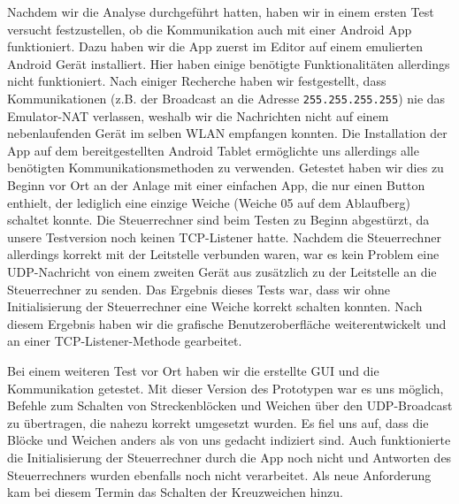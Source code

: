 \documentclass{article}
\begin{document}
Nachdem wir die Analyse durchgeführt hatten, haben wir in einem ersten Test versucht festzustellen, ob die Kommunikation auch mit einer Android App funktioniert.
Dazu haben wir die App zuerst im Editor auf einem emulierten Android Gerät installiert.
Hier haben einige benötigte Funktionalitäten allerdings nicht funktioniert.
Nach einiger Recherche haben wir festgestellt, dass Kommunikationen (z.B. der Broadcast an die Adresse \texttt{255.255.255.255}) nie das Emulator-NAT verlassen, weshalb wir die Nachrichten nicht auf einem nebenlaufenden Gerät im selben WLAN empfangen konnten.
Die Installation der App auf dem bereitgestellten Android Tablet ermöglichte uns allerdings alle benötigten Kommunikationsmethoden zu verwenden.
Getestet haben wir dies zu Beginn vor Ort an der Anlage mit einer einfachen App, die nur einen Button enthielt, der lediglich eine einzige Weiche (Weiche 05 auf dem Ablaufberg) schaltet konnte.
Die Steuerrechner sind beim Testen zu Beginn abgestürzt, da unsere Testversion noch keinen TCP-Listener hatte.
Nachdem die Steuerrechner allerdings korrekt mit der Leitstelle verbunden waren, war es kein Problem eine UDP-Nachricht von einem zweiten Gerät aus zusätzlich zu der Leitstelle an die Steuerrechner zu senden.
Das Ergebnis dieses Tests war, dass wir ohne Initialisierung der Steuerrechner eine Weiche korrekt schalten konnten.
Nach diesem Ergebnis haben wir die grafische Benutzeroberfläche weiterentwickelt und an einer TCP-Listener-Methode gearbeitet.

Bei einem weiteren Test vor Ort haben wir die erstellte GUI und die Kommunikation getestet.
Mit dieser Version des Prototypen war es uns möglich, Befehle zum Schalten von Streckenblöcken und Weichen über den UDP-Broadcast zu übertragen, die nahezu korrekt umgesetzt wurden.
Es fiel uns auf, dass die Blöcke und Weichen anders als von uns gedacht indiziert sind.
Auch funktionierte die Initialisierung der Steuerrechner durch die App noch nicht und Antworten des Steuerrechners wurden ebenfalls noch nicht verarbeitet.
Als neue Anforderung kam bei diesem Termin das Schalten der Kreuzweichen hinzu.
\end{document}
